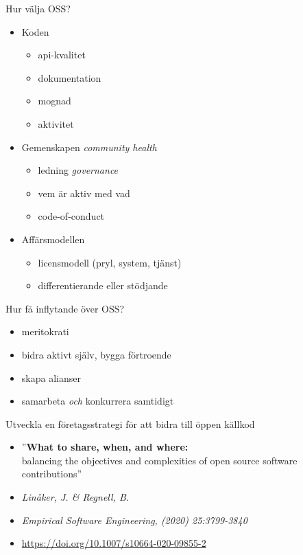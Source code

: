 \documentclass{simpleslides}
\begin{document}
\begin{Slide}{Hur välja OSS?}
\begin{itemize}
\item Koden
\begin{itemize}
\item api-kvalitet 
\item dokumentation
\item mognad
\item aktivitet
\end{itemize}  
\item Gemenskapen \hfill \emph{community health}
\begin{itemize}
\item ledning \hfill \emph{governance}
\item vem är aktiv med vad
\item code-of-conduct 
\end{itemize}  
\item Affärsmodellen
\begin{itemize}
\item licensmodell (pryl, system, tjänst)
\item differentierande eller stödjande
\end{itemize}  
\end{itemize}  
\end{Slide}

\begin{Slide}{Hur få inflytande över OSS?}
\begin{itemize}
  \item meritokrati
  \item bidra aktivt själv, bygga förtroende
  \item skapa alianser
  \item samarbeta \emph{och} konkurrera samtidigt
\end{itemize}  
\end{Slide}


\begin{Slide}{Utveckla en företagsstrategi för att bidra till öppen källkod}
\begin{itemize}\small
  \item[] ''\textbf{What to share, when, and where:}\\balancing the objectives and complexities of open source software contributions''
  \item[] \emph{Linåker, J. \& Regnell, B.} 
  \item[] \emph{\tiny Empirical Software Engineering, (2020) 25:3799-3840} 
  \item[] {\tiny \url{https://doi.org/10.1007/s10664-020-09855-2}}
\end{itemize}  
\end{Slide}


\end{document}
